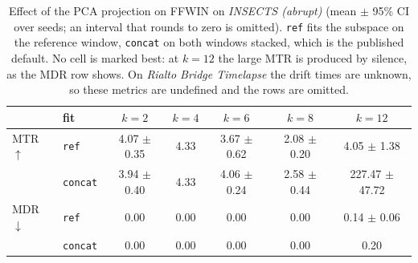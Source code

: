 \begin{table}[!t]
\centering
\caption{Effect of the PCA projection on \ac{FFWIN} on \textit{INSECTS (abrupt)} (mean $\pm$ 95\% CI over seeds; an interval that rounds to zero is omitted). \texttt{ref} fits the subspace on the reference window, \texttt{concat} on both windows stacked, which is the published default. No cell is marked best: at $k{=}12$ the large \ac{MTR} is produced by silence, as the \ac{MDR} row shows. On \textit{Rialto Bridge Timelapse} the drift times are unknown, so these metrics are undefined and the rows are omitted.}
\label{tab:pca_ablation}
\scriptsize
\setlength{\tabcolsep}{3pt}
\begin{tabular}{@{}llccccc@{}}
\toprule
  & \textbf{fit} & $k{=}2$ & $k{=}4$ & $k{=}6$ & $k{=}8$ & $k{=}12$ \\
\midrule
\ac{MTR}\,$\uparrow$ & \texttt{ref} & 4.07 $\pm$ 0.35 & 4.33 & 3.67 $\pm$ 0.62 & 2.08 $\pm$ 0.20 & 4.05 $\pm$ 1.38 \\
 & \texttt{concat} & 3.94 $\pm$ 0.40 & 4.33 & 4.06 $\pm$ 0.24 & 2.58 $\pm$ 0.44 & 227.47 $\pm$ 47.72 \\
\ac{MDR}\,$\downarrow$ & \texttt{ref} & 0.00 & 0.00 & 0.00 & 0.00 & 0.14 $\pm$ 0.06 \\
 & \texttt{concat} & 0.00 & 0.00 & 0.00 & 0.00 & 0.20 \\
\bottomrule
\end{tabular}
\end{table}
